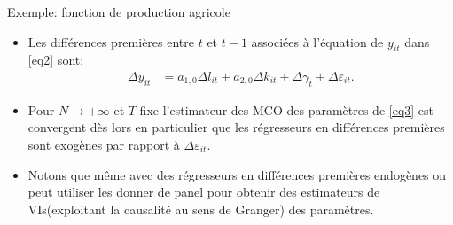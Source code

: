 \begin{frame}[allowframebreaks]{Exemple: fonction de production agricole}
\begin{itemize}
\begin{enumerate}[$\star$]
        \end{enumerate}
        \item Les différences premières entre $t$ et $t-1$ associées à l'équation de $y_{it}$ dans \eqref{eq2} sont:
        \begin{align}
            \Delta y_{it} &= a_{1, 0}\Delta l_{it} + a_{2, 0}\Delta k_{it} + \Delta \gamma_t +\Delta \varepsilon_{it}.
            \label{eq3}
        \end{align}
        \item Pour $N\rightarrow +\infty$ et $T$ fixe l'estimateur des MCO des paramètres 
        de \eqref{eq3} est convergent dès lors en particulier que les régresseurs 
        en différences premières sont exogènes par rapport à $\Delta \varepsilon_{it}$.
        \item Notons que même avec des régresseurs en différences premières  endogènes
         on peut utiliser les donner de panel pour obtenir des estimateurs de VIs(exploitant la 
         causalité au sens de Granger) des paramètres.
    \end{itemize}
\end{frame}

